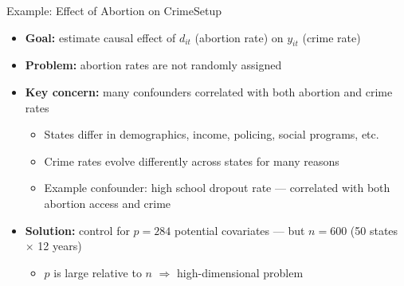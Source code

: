 \documentclass[hyperref={pdfpagelabels=false}]{beamer}
\begin{document}
\begin{frame}{Example: Effect of Abortion on Crime}{Setup}
    \begin{itemize}
        \item \textbf{Goal:} estimate causal effect of $d_{it}$ 
        (abortion rate) on $y_{it}$ (crime rate)
        \vspace{0.2cm}
        \item \textbf{Problem:} abortion rates are not randomly assigned
        \vspace{0.2cm}
        \item \textbf{Key concern:} many confounders correlated with 
        both abortion and crime rates
        \begin{itemize}
            \vspace{0.2cm}
            \item States differ in demographics, income, policing, 
            social programs, etc.
            \vspace{0.2cm}
            \item Crime rates evolve differently across states 
            for many reasons
            \vspace{0.2cm}
            \item Example confounder: high school dropout rate 
            --- correlated with both abortion access and crime
        \end{itemize}
        \vspace{0.2cm}
        \item \textbf{Solution:} control for $p = 284$ potential 
        covariates --- but $n = 600$ (50 states $\times$ 12 years)
        \begin{itemize}
            \vspace{0.1cm}
            \item $p$ is large relative to $n$ $\Rightarrow$ 
            high-dimensional problem
        \end{itemize}
    \end{itemize}
\end{frame}
\end{document}
